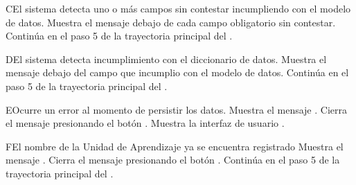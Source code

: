 \begin{UCtrayectoriaA}{C}{El sistema detecta uno o más campos sin contestar incumpliendo con el modelo de datos.}
	\UCpaso Muestra el mensaje debajo de cada campo obligatorio sin contestar.
	\UCpaso Continúa en el paso 5 de la trayectoria principal del .
\end{UCtrayectoriaA}

\begin{UCtrayectoriaA}{D}{El sistema detecta incumplimiento con el diccionario de datos.}
	\UCpaso Muestra el mensaje  debajo del campo que incumplio con el modelo de datos.
	\UCpaso Continúa en el paso 5 de la trayectoria principal del .
\end{UCtrayectoriaA}

\begin{UCtrayectoriaA}{E}{Ocurre un error al momento de persistir los datos.}
	\UCpaso Muestra el mensaje .
	\UCpaso[\UCactor] Cierra el mensaje presionando el botón .
	\UCpaso Muestra la interfaz de usuario .
\end{UCtrayectoriaA}


\begin{UCtrayectoriaA}{F}{El nombre de la Unidad de Aprendizaje ya se encuentra registrado}
	\UCpaso Muestra el mensaje .
	\UCpaso[\UCactor] Cierra el mensaje presionando el botón .
	\UCpaso Continúa en el paso 5 de la trayectoria principal del .
\end{UCtrayectoriaA}
